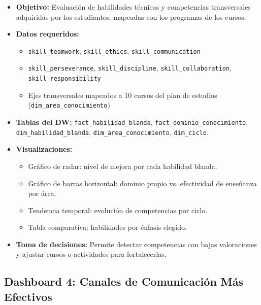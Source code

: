 \documentclass[12pt, letterpaper]{article}
\begin{document}
\begin{itemize}
  \item \textbf{Objetivo:} Evaluación de habilidades técnicas y competencias transversales adquiridas por los estudiantes, mapeadas con los programas de los cursos.
  \item \textbf{Datos requeridos:}
  \begin{itemize}
    \item \texttt{skill\_teamwork}, \texttt{skill\_ethics}, \texttt{skill\_communication}
    \item \texttt{skill\_perseverance}, \texttt{skill\_discipline}, \texttt{skill\_collaboration}, \texttt{skill\_responsibility}
    \item Ejes transversales mapeados a 10 cursos del plan de estudios (\texttt{dim\_area\_conocimiento})
  \end{itemize}
  \item \textbf{Tablas del DW:} \texttt{fact\_habilidad\_blanda}, \texttt{fact\_dominio\_conocimiento}, \texttt{dim\_habilidad\_blanda}, \texttt{dim\_area\_conocimiento}, \texttt{dim\_ciclo}.
  \item \textbf{Visualizaciones:}
  \begin{itemize}
    \item Gráfico de radar: nivel de mejora por cada habilidad blanda.
    \item Gráfico de barras horizontal: dominio propio vs. efectividad de enseñanza por área.
    \item Tendencia temporal: evolución de competencias por ciclo.
    \item Tabla comparativa: habilidades por énfasis elegido.
  \end{itemize}
  \item \textbf{Toma de decisiones:} Permite detectar competencias con bajas valoraciones y ajustar cursos o actividades para fortalecerlas.
\end{itemize}

\subsection{Dashboard 4: Canales de Comunicación Más Efectivos}
\end{document}
